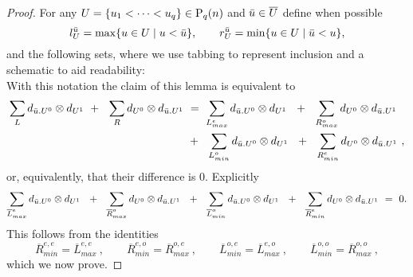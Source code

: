 \begin{proof}
	For any $U = \{u_1 < \cdots < u_q\} \in \P_{q}(n)$ and $\bu \in \overline{U}$ define when possible
	\begin{equation*}
	l_U^\bu = \max \{u \in U \mid u < \bu\}, \qquad
	r_U^\bu = \min\{u \in U \mid \bu < u\},
	\end{equation*}
	and the following sets, where we use tabbing to represent inclusion and a schematic to aid readability:\\
	
	
	
	With this notation the claim of this lemma is equivalent to 
	\begin{align*}
	\sum_{L} d_{\bu.U^0} \otimes d_{U^1}\ +\ \ 
	\sum_{R} d_{U^0} \otimes d_{\bu.U^1} \ & = \
	\sum_{{L}_{max}^{e}} d_{\bu.U^0} \otimes d_{U^1}\ \ +\ \ 
	\sum_{{R}_{max}^{o}} d_{U^0} \otimes d_{\bu.U^1}\ \\ \ & +\ \ 
	\sum_{{L}_{min}^{o}} d_{\bu.U^0} \otimes d_{U^1}\ \ +\ \ 
	\sum_{{R}_{min}^{e}} d_{U^0} \otimes d_{\bu.U^1} \ ,
	\end{align*}
	or, equivalently, that their difference is $0$.
	Explicitly
	\begin{equation*}
	\sum_{\overline{L}_{max}^{e}} d_{\bu.U^0} \otimes d_{U^1}\ \ +\ \ 
	\sum_{\overline{R}_{max}^{o}} d_{U^0} \otimes d_{\bu.U^1}\ \ +\ \ 
	\sum_{\overline{L}_{min}^{o}} d_{\bu.U^0} \otimes d_{U^1}\ \ +\ \ 
	\sum_{\overline{R}_{min}^{e}} d_{U^0} \otimes d_{\bu.U^1} \ = \ 0.
	\end{equation*}
	This follows from the identities
	\begin{equation} \label{e:big lemma four identities}
	\overline{R}_{min}^{e,e} = \overline{L}_{max}^{e,e}\ , \qquad
	\overline{R}_{min}^{e,o} = \overline{R}_{max}^{o,e}\ , \qquad 
	\overline{L}_{min}^{o,e} = \overline{L}_{max}^{e,o}\ , \qquad
	\overline{L}_{min}^{o,o} = \overline{R}_{max}^{o,o}\ ,
	\end{equation}
	which we now prove.
	

\end{proof}
